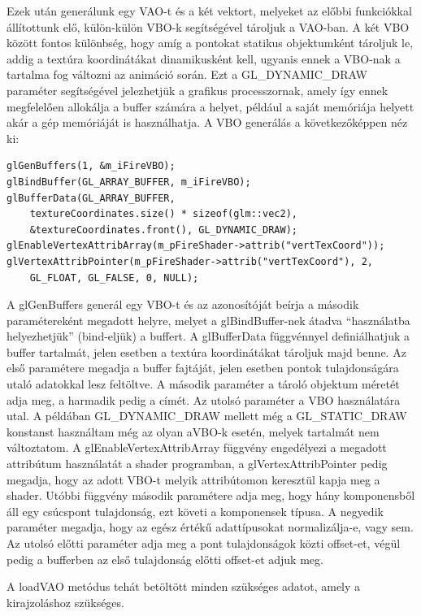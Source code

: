 Ezek után generálunk egy VAO-t és a két vektort, melyeket az előbbi funkciókkal állítottunk elő, külön-külön VBO-k segítségével tároljuk a VAO-ban. A két VBO között fontos különbség, hogy amíg a pontokat statikus objektumként tároljuk le, addig a textúra koordinátákat dinamikusként kell, ugyanis ennek a VBO-nak a tartalma fog változni az animáció során. Ezt a GL\_DYNAMIC\_DRAW paraméter segítségével jelezhetjük a grafikus processzornak, amely így ennek megfelelően allokálja a buffer számára a helyet, például a saját memóriája helyett akár a gép memóriáját is használhatja.
A VBO generálás a következőképpen néz ki:
\begin{lstlisting}
glGenBuffers(1, &m_iFireVBO);
glBindBuffer(GL_ARRAY_BUFFER, m_iFireVBO);
glBufferData(GL_ARRAY_BUFFER, 
	textureCoordinates.size() * sizeof(glm::vec2), 
	&textureCoordinates.front(), GL_DYNAMIC_DRAW);
glEnableVertexAttribArray(m_pFireShader->attrib("vertTexCoord"));
glVertexAttribPointer(m_pFireShader->attrib("vertTexCoord"), 2, 
	GL_FLOAT, GL_FALSE, 0, NULL);
\end{lstlisting}
A glGenBuffers generál egy VBO-t és az azonosítóját beírja a második paramétereként megadott helyre, melyet a glBindBuffer-nek átadva ``használatba helyezhetjük'' (bind-eljük) a buffert. A glBufferData függvénnyel definiálhatjuk a buffer tartalmát, jelen esetben a textúra koordinátákat tároljuk majd benne. Az első paramétere megadja a buffer fajtáját, jelen esetben pontok tulajdonságára utaló adatokkal lesz feltöltve. A második paraméter a tároló objektum méretét adja meg, a harmadik pedig a címét. Az utolsó paraméter a VBO használatára utal. A példában GL\_DYNAMIC\_DRAW mellett még a GL\_STATIC\_DRAW konstanst használtam még az olyan aVBO-k esetén, melyek tartalmát nem változtatom. A glEnableVertexAttribArray függvény engedélyezi a megadott attribútum használatát a shader programban, a glVertexAttribPointer pedig megadja, hogy az adott VBO-t melyik attribútomon keresztül kapja meg a shader. Utóbbi függvény második paramétere adja meg, hogy hány komponensből áll egy csúcspont tulajdonság, ezt követi a komponensek típusa. A negyedik paraméter megadja, hogy az egész értékű adattípusokat normalizálja-e, vagy sem. Az utolsó előtti paraméter adja meg a pont tulajdonságok közti offset-et, végül pedig a bufferben az első tulajdonság előtti offset-et adjuk meg.

A loadVAO metódus tehát betöltött minden szükséges adatot, amely a kirajzoláshoz szükséges.

